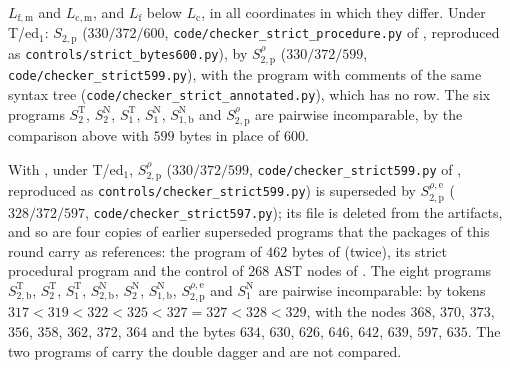 $L_{\mathrm{f,m}}$ and $L_{\mathrm{c,m}}$, and $L_{\mathrm f}$ below $L_{\mathrm c}$,
in all coordinates in which they differ. Under T/ed$_1$: $S_{2,\mathrm p}$
($330/372/600$, \texttt{code/checker\_strict\_procedure.py} of
, reproduced as \texttt{controls/strict\_bytes600.py}),
by $S^{\rho}_{2,\mathrm p}$ ($330/372/599$, \texttt{code/checker\_strict599.py}),
with the program with comments of the same syntax tree
(\texttt{code/checker\_strict\_annotated.py}), which has no row. The six programs
$S^{\mathrm T}_2$, $S^{\mathrm N}_2$, $S^{\mathrm T}_1$, $S^{\mathrm N}_1$,
$S^{\mathrm N}_{1,\mathrm b}$ and $S^{\rho}_{2,\mathrm p}$ are pairwise
incomparable, by the comparison above with $599$ bytes in place of $600$.

With , under T/ed$_1$, $S^{\rho}_{2,\mathrm p}$
($330/372/599$, \texttt{code/checker\_strict599.py} of ,
reproduced as \texttt{controls/checker\_strict599.py}) is superseded by
$S^{\rho,\mathrm e}_{2,\mathrm p}$ ($328/372/597$,
\texttt{code/checker\_strict597.py}); its file is deleted from the artifacts, and so are
four copies of earlier superseded programs that the packages of this round carry as
references: the program of $462$ bytes of  (twice), its
strict procedural program and the control of $268$ AST nodes of .
The eight programs $S^{\mathrm T}_{2,\mathrm b}$,
$S^{\mathrm T}_2$, $S^{\mathrm T}_1$, $S^{\mathrm N}_{2,\mathrm b}$, $S^{\mathrm N}_2$,
$S^{\mathrm N}_{1,\mathrm b}$, $S^{\rho,\mathrm e}_{2,\mathrm p}$ and $S^{\mathrm N}_1$
are pairwise incomparable: by tokens $317<319<322<325<327=327<328<329$, with the
nodes $368$, $370$, $373$, $356$, $358$, $362$, $372$, $364$ and the bytes $634$,
$630$, $626$, $646$, $642$, $639$, $597$, $635$. The two programs of
 carry the double dagger and are not compared.

